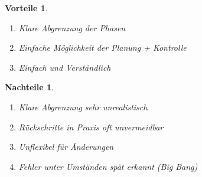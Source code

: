 \documentclass[a4paper]{article}
\theoremstyle{break}
\newtheorem{why}{Vorteile}[section]
\newtheorem{whynot}{Nachteile}[section]
\begin{document}
\begin {why}
  \begin {enumerate}
    \item Klare Abgrenzung der Phasen
    \item Einfache Möglichkeit der Planung + Kontrolle
      \item Einfach und Verständlich
  \end {enumerate}
  
\end {why}
\begin {whynot}
  \begin {enumerate}
  \item Klare Abgrenzung sehr unrealistisch
  \item Rückschritte in Praxis oft unvermeidbar
  \item Unflexibel für Änderungen
  \item Fehler unter Umständen spät erkannt (Big Bang)
  \end {enumerate}
\end {whynot}
\end{document}
